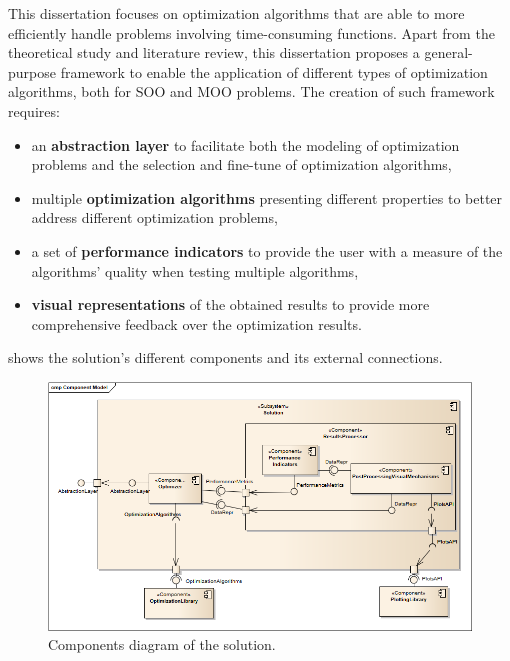 \label{chap:architecture}

This dissertation focuses on optimization algorithms that are able to more efficiently handle problems involving time-consuming functions. Apart from the theoretical study and literature review, this dissertation proposes a general-purpose framework to enable the application of different types of optimization algorithms, both for \ac{SOO} and \ac{MOO} problems. The creation of such framework requires: 
\begin{itemize}
	\item an \textbf{abstraction layer} to facilitate both the modeling of optimization problems and the selection and fine-tune of optimization algorithms,
	\item multiple \textbf{optimization algorithms} presenting different properties to better address different optimization problems,
	\item a set of \textbf{performance indicators} to provide the user with a measure of the algorithms' quality when testing multiple algorithms,
	\item \textbf{visual representations} of the obtained results to provide more comprehensive feedback over the optimization results.
\end{itemize}
 shows the  solution's different components and its external connections.

\begin{figure}[htbp]
	\centering
	\includegraphics[width=\textwidth]{./Images/Solution/ComponentModel3.png}
	\caption{Components diagram of the solution.}
	\label{fig:solution}
\end{figure}

